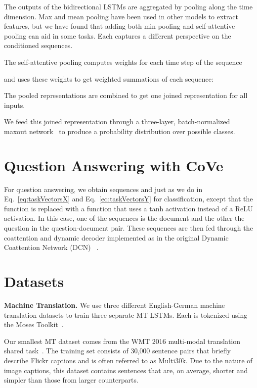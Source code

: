 \documentclass{article}
\begin{document}
The outputs of the bidirectional LSTMs are aggregated by pooling along the time dimension.
Max and mean pooling have been used in other models to extract features, 
but we have found that adding both min pooling 
and self-attentive pooling can aid in some tasks.
Each captures a different perspective on the conditioned sequences.

The self-attentive pooling computes weights for each time step of the sequence 


and uses these weights to get weighted summations of each sequence:


The pooled representations are combined to get one joined representation for all inputs. 


We feed this joined representation through a three-layer, 
batch-normalized~\citep{Ioffe2015BatchNA} maxout network~\citep{Goodfellow2013MaxoutN} 
to produce a probability distribution over possible classes.

\section{Question Answering with CoVe}

For question answering, 
we obtain sequences  and  just as we do in Eq.~\ref{eq:taskVectorsX} and Eq.~\ref{eq:taskVectorsY} for classification, except that the function  is replaced with a function  that uses a tanh activation instead of a ReLU activation.
In this case, one of the sequences is the document and the other the question in the question-document pair.
These sequences are then fed through the coattention and dynamic decoder implemented as in the original Dynamic Coattention Network (DCN) ~\citep{xiong2016dynamic}.  \section{Datasets}

\textbf{Machine Translation.} 
We use three different English-German machine translation datasets to train three separate MT-LSTMs. 
Each is tokenized using the Moses Toolkit~\citep{Koehn2007}.

Our smallest MT dataset comes from the WMT 2016 multi-modal translation shared task~\citep{Specia2016}.
The training set consists of 30,000 sentence pairs that briefly describe Flickr captions and is often referred to as Multi30k.
Due to the nature of image captions, this dataset contains sentences that are, on average, shorter and simpler than those from larger counterparts.
\end{document}
